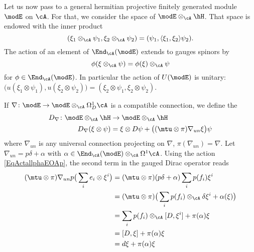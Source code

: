 Let us now pass to a general hermitian projective finitely generated module $\modE$ on $\cA$. For that, we consider the space of  $\modE\otimes_{\cA}\hH$. That space is endowed with the inner product
\begin{equation}
	( \xi_1\otimes_{\cA}\psi_1,\xi_2\otimes_{\cA}\psi_2  )=(\psi_1,\langle \xi_1, \xi_2\rangle \psi_2).
\end{equation}
The action of an element of $\End_{\cA}(\modE)$ extends to gauges spinors by
\[
	\phi(\xi\otimes_{\cA}\psi)=\phi(\xi)\otimes_{\cA}\psi
\]
for $\phi\in\End_{\cA}(\modE)$. In particular the action of $U(\modE)$ is unitary: $\big( u(\xi_1\otimes\psi_1),u(\xi_2\otimes\psi_2) \big)=(\xi_2\otimes\psi_1,\xi_2\otimes\psi_2)$.

If $\nabla\colon \modE\to \modE\otimes_{\cA}\Omega^1_D\cA$ is a compatible connection, we define the 
\begin{equation}
	\begin{aligned}
		D_{\nabla}\colon \modE\otimes_{\cA}\hH & \to \modE\otimes_{\cA}\hH                                        \\
		D_{\nabla}(\xi\otimes\psi)             & =	\xi\otimes D\psi+\big( (\mtu\otimes\pi)\nabla_{un}\xi \big)\psi
	\end{aligned}
\end{equation}
where $\nabla_{un}$ is any universal connection projecting on $\nabla$, $\pi(\nabla_{un})=\nabla$. Let $\nabla_{un}=p\delta+\alpha$ with $\alpha\in\End_{\cA}(\modE)\otimes_{\cA}\Omega^1\cA$. Using the action \eqref{EqActallphaEOAp}, the second term in the gauged Dirac operator reads
\begin{align*}
	(\mtu\otimes\pi)\nabla_{un}p\big(  \sum_ie_i\otimes\xi^i \big) & =(\mtu\otimes\pi)(p\delta+\alpha)\sum_ip(f_i)\xi^i                                \\
	                                                               & =(\mtu\otimes\pi)\big( \sum_ip(f_i) \otimes_{\cA} \delta \xi^i +\alpha(\xi) \big) \\
	                                                               & =\sum_ip(f_i)\otimes_{\cA}[D,\xi^i]+\pi(\alpha)\xi                                \\
	                                                               & =[D,\xi]+\pi(\alpha)\xi                                                           \\
	                                                               & =d\xi+\pi(\alpha)\xi
\end{align*}
